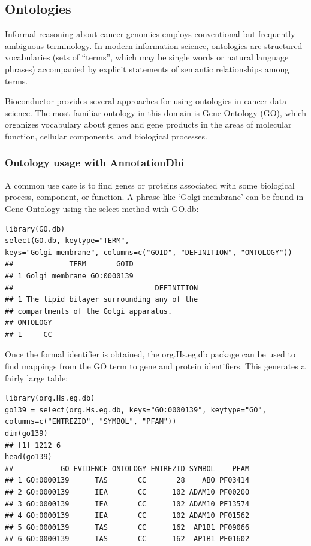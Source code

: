 \subsection{Ontologies}\label{ontologies}

Informal reasoning about cancer genomics employs conventional
but frequently ambiguous terminology. In modern
information science, ontologies are structured vocabularies
(sets of ``terms'', which may be single words or natural language
phrases) accompanied by
explicit statements of semantic relationships among terms.

Bioconductor provides several approaches for using ontologies
in cancer data science. The most familiar ontology
in this domain is Gene Ontology (GO), which organizes vocabulary
about genes and gene products in
the areas of molecular function, cellular components, and
biological processes.

\subsubsection{Ontology usage with AnnotationDbi}\label{ontology-usage-with-annotationdbi}

A common use case is to find genes or proteins associated
with some biological process, component, or function.
A phrase like `Golgi membrane' can be found in Gene Ontology
using the select method with GO.db:

\begin{shaded}
\begin{verbatim}
library(GO.db)
select(GO.db, keytype="TERM",
keys="Golgi membrane", columns=c("GOID", "DEFINITION", "ONTOLOGY"))
##             TERM       GOID
## 1 Golgi membrane GO:0000139
##                                 DEFINITION
## 1 The lipid bilayer surrounding any of the 
## compartments of the Golgi apparatus.
## ONTOLOGY
## 1     CC
\end{verbatim}
\end{shaded}

Once the formal identifier is obtained, the org.Hs.eg.db package can be used to find mappings
from the GO term to gene and protein identifiers. This generates a fairly large table:

\begin{shaded}
\begin{verbatim}
library(org.Hs.eg.db)
go139 = select(org.Hs.eg.db, keys="GO:0000139", keytype="GO",
columns=c("ENTREZID", "SYMBOL", "PFAM"))
dim(go139)
## [1] 1212 6
head(go139)
##           GO EVIDENCE ONTOLOGY ENTREZID SYMBOL    PFAM
## 1 GO:0000139      TAS       CC       28    ABO PF03414
## 2 GO:0000139      IEA       CC      102 ADAM10 PF00200
## 3 GO:0000139      IEA       CC      102 ADAM10 PF13574
## 4 GO:0000139      IEA       CC      102 ADAM10 PF01562
## 5 GO:0000139      TAS       CC      162  AP1B1 PF09066
## 6 GO:0000139      TAS       CC      162  AP1B1 PF01602
\end{verbatim}
\end{shaded}

